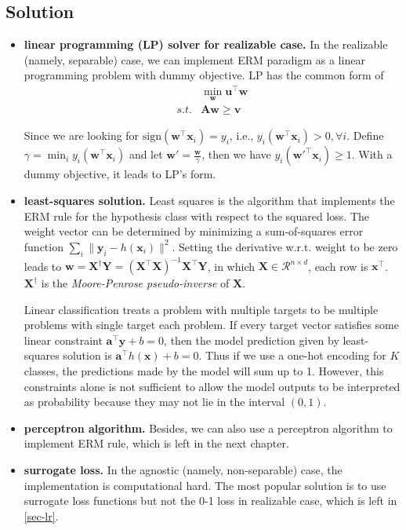 \documentclass{article}
\begin{document}
	\subsection{Solution}
	
	\begin{itemize}
	\item \textbf{linear programming (LP) solver for realizable case.} In the realizable (namely, separable) case, we can implement ERM paradigm as a linear programming problem with dummy objective. LP has the common form of
	\begin{equation*}
	\begin{split}
	&\min_\mathbf{w} \mathbf{u}^\top \mathbf{w} \\
	s.t. & \mathbf{Aw} \geq \mathbf{v}
	\end{split}
	\end{equation*}
	
	Since we are looking for $\text{sign}(\mathbf{w}^\top \mathbf{x}_i)=y_i$, i.e., $y_i(\mathbf{w}^\top \mathbf{x}_i)> 0, \forall i$. Define $\gamma=\min_i y_i(\mathbf{w}^\top \mathbf{x}_i)$ and let $\mathbf{w}'=\frac{\mathbf{w}}{\gamma}$, then we have $y_i(\mathbf{w}'^\top \mathbf{x}_i)\geq 1 $. With a dummy objective, it leads to LP's form.
	
	\item \textbf{least-squares solution.} Least squares is the algorithm that implements the ERM rule for the hypothesis class with respect to the squared loss. The weight vector can be determined by minimizing a sum-of-squares error function $\sum_i \|\mathbf{y}_i-h(\mathbf{x}_i)\|^2$. Setting the derivative w.r.t. weight to be zero leads to $\mathbf{w} = \mathbf{X}^\dagger \mathbf{Y} = (\mathbf{X}^\top \mathbf{X})^{-1} \mathbf{X}^\top \mathbf{Y}$, in which $\mathbf{X}\in \mathcal{R}^{n\times d}$, each row is $\mathbf{x}^\top$. $\mathbf{X}^\dagger$ is the  \textit{Moore-Penrose pseudo-inverse} of $\mathbf{X}$.
	
	Linear classification treats a problem with multiple targets to be multiple problems with single target each problem. If every target vector satisfies some  linear constraint $\mathbf{a}^\top \mathbf{y} + b = 0$, then the model prediction given by least-squares solution is $\mathbf{a}^\top h(\mathbf{x}) + b = 0$. Thus if we use a one-hot encoding for $K$ classes, the predictions made by the model will sum up to 1. However, this constraints alone is not sufficient to allow the model outputs to be interpreted as probability because they may not lie in the interval $(0,1)$.

	\item \textbf{perceptron algorithm.} Besides, we can also use a perceptron algorithm to implement ERM rule, which is left in the next chapter.	
	\item \textbf{surrogate loss.} In the agnostic (namely, non-separable) case, the implementation is computational hard. The most popular solution is to use surrogate loss functions but not the 0-1 loss in realizable case, which is left in \ref{sec-lr}.
	
	\end{itemize}
	
\end{document}
